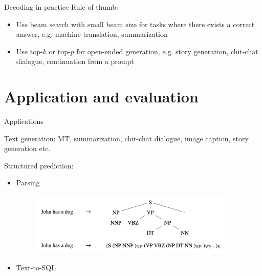 \documentclass[usenames,dvipsnames,11pt,aspectratio=169]{beamer}
\begin{document}
\begin{frame}
    {Decoding in practice}
    Rule of thumb:\\
    \begin{itemize}
        \item Use beam search with small beam size for tasks where there exists a correct answer, e.g. machine translation, summarization
        \item Use top-$k$ or top-$p$ for open-ended generation, e.g. story generation, chit-chat dialogue, continuation from a prompt
    \end{itemize}
\end{frame}

\section{Application and evaluation}

\begin{frame}
    {Applications}

    {Text generation}: MT, summarization, chit-chat dialogue, image caption, story generation etc.

    {Structured prediction}:
    \begin{itemize}
        \item Parsing
    \begin{figure}
        \includegraphics[height=3cm]{figures/s2s-parsing}
    \end{figure}
\item Text-to-SQL
    \end{itemize}
\end{frame}
\end{document}
